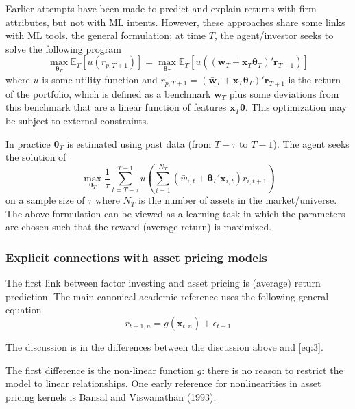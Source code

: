 Earlier attempts have been made to predict and explain returns with firm attributes, but not with ML intents. However, these approaches share some links with ML tools. the general formulation; at time $T$, the agent/investor seeks to solve the following program
\begin{equation*}
    \max_{\mathbf{\theta}_{T}} \mathbb{E}_{T}[u(r_{p,T+1})] = \max_{\mathbf{\theta}_{T}} \mathbb{E}_{T}[u((\bar{\mathbf{w}}_T + \mathbf{x}_{T}\boldsymbol{\theta}_{T})' \mathbf{r}_{T+1})]
\end{equation*}
where $u$ is some utility function and $r_{p,T+1} = (\bar{\mathbf{w}}_T + \mathbf{x}_{T}\boldsymbol{\theta}_{T})' \mathbf{r}_{T+1}$ is the return of the portfolio, which is defined as a benchmark $\bar{\mathbf{w}}_T$ plus some deviations from this benchmark that are a linear function of features $\mathbf{x}_{T}\boldsymbol{\theta}$. This optimization may be subject to external constraints.

In practice $\boldsymbol{\theta }_{T}$ is estimated using past data (from $T-\tau$ to $T-1$). The agent seeks the solution of
\begin{equation}
    \max_{\boldsymbol{\theta}_{T}} \frac{1}{\tau} \sum_{t=T-\tau}^{T-1} u \left( \sum _{i=1}^{N_{T}} (\bar{w}_{i,t} + \boldsymbol{\theta}_{T}' \mathbf{x}_{i,t}) r_{i,t+1} \right)
\end{equation}
on a sample size of $\tau$ where $N_{T}$ is the number of assets in the market/universe. The above formulation can be viewed as a learning task in which the parameters are chosen such that the reward (average return) is maximized.

\subsubsection{Explicit connections with asset pricing models}
The first link between factor investing and asset pricing is (average) return prediction. The main canonical academic reference uses the following general equation
\begin{equation}
  r_{t+1,n} = g(\mathbf{x}_{t,n}) + \epsilon_{t+1} \label{eq:3.6}
\end{equation}

The discussion is in the differences between the discussion above and \eqref{eq:3}. 

The first difference is the non-linear function $g$: there is no reason to restrict the model to linear relationships. One early reference for nonlinearities in asset pricing kernels is Bansal and Viswanathan (1993).

